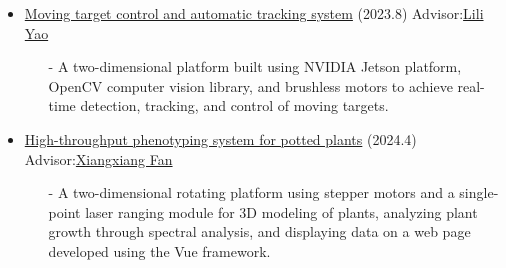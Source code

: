 \documentclass{article}
\begin{document}
\begin{itemize}
    \item \href{http://resume.uint16kun.com/my-projects/Moving%20target%20control%20and%20automatic%20tracking%20system.html}{Moving target control and automatic tracking system} (2023.8)     Advisor:\href{http://xxgcxy.zjhu.edu.cn/2023/0411/c5546a193663/page.htm}{Lili Yao}
          \begin{itemize}
              \item[-] A two-dimensional platform built using NVIDIA Jetson platform, OpenCV computer vision library, and brushless motors to achieve real-time detection, tracking, and control of moving targets.
          \end{itemize}
    \item \href{http://resume.uint16kun.com/my-projects/High-throughput%20phenotyping%20system%20for%20potted%20plants.html}{High-throughput phenotyping system for potted plants} (2024.4)     Advisor:\href{http://xxgcxy.zjhu.edu.cn/2021/0326/c5544a166633/page.htm}{Xiangxiang Fan}    
          \begin{itemize}
              \item[-] A two-dimensional rotating platform using stepper motors and a single-point laser ranging module for 3D modeling of plants, analyzing plant growth through spectral analysis, and displaying data on a web page developed using the Vue framework.
          \end{itemize}

\end{itemize}
\end{document}
